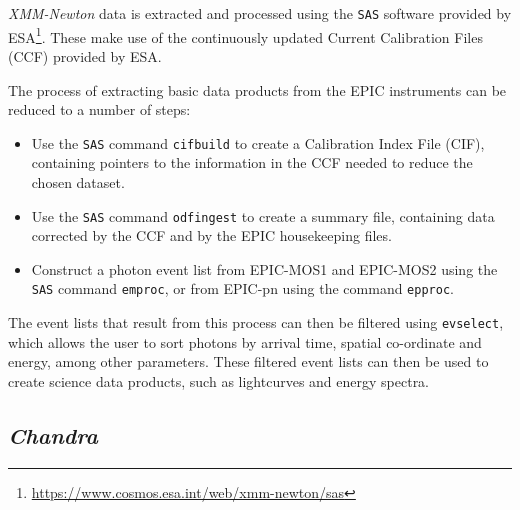 \par \textit{XMM-Newton} data is extracted and processed using the \texttt{SAS} software \citep{Ibarra_sas} provided by ESA\footnote{\url{https://www.cosmos.esa.int/web/xmm-newton/sas}}.  These make use of the continuously updated Current Calibration Files (CCF) provided by ESA.
\par The process of extracting basic data products from the EPIC instruments can be reduced to a number of steps:
\begin{itemize}
\item Use the \texttt{SAS} command \texttt{cifbuild} to create a Calibration Index File (CIF), containing pointers to the information in the CCF needed to reduce the chosen dataset.
\item Use the \texttt{SAS} command \texttt{odfingest} to create a summary file, containing data corrected by the CCF and by the EPIC housekeeping files.
\item Construct a photon event list from EPIC-MOS1 and EPIC-MOS2 using the \texttt{SAS} command \texttt{emproc}, or from EPIC-pn using the command \texttt{epproc}.
\end{itemize}
The event lists that result from this process can then be filtered using \texttt{evselect}, which allows the user to sort photons by arrival time, spatial co-ordinate and energy, among other parameters.  These filtered event lists can then be used to create science data products, such as lightcurves and energy spectra.

\subsection{\textit{Chandra}}

